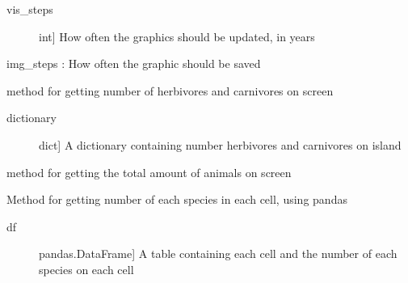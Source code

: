 \documentclass[a4paper,10pt,english]{sphinxmanual}
\begin{document}
\begin{fulllineitems}
\begin{fulllineitems}
\begin{description}
\item[{vis\_steps}] \leavevmode{[}int{]}
How often the graphics should be updated, in years

\end{description}

img\_steps : How often the graphic should be saved

\end{fulllineitems}


\begin{fulllineitems}
\label{\detokenize{simulation:biosim.simulation.BioSim.status_number_of_animals_by_species}}
method for getting number of herbivores and carnivores on screen
\begin{description}
\item[{dictionary}] \leavevmode{[}dict{]}
A dictionary containing number herbivores and carnivores on island

\end{description}

\end{fulllineitems}


\begin{fulllineitems}
\label{\detokenize{simulation:biosim.simulation.BioSim.status_number_of_animals_total}}
method for getting the total amount of animals on screen

\end{fulllineitems}


\begin{fulllineitems}
\label{\detokenize{simulation:biosim.simulation.BioSim.status_per_cell_animal_count}}
Method for getting number of each species in each cell, using pandas
\begin{description}
\item[{df}] \leavevmode{[}pandas.DataFrame{]}
A table containing each cell and the number of each species on
each cell


\end{description}
\end{fulllineitems}
\end{fulllineitems}
\end{document}
